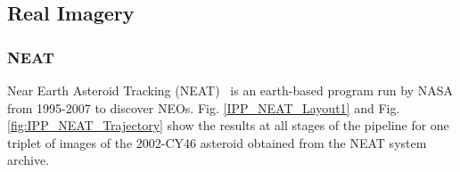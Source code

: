 \subsection{Real Imagery}

\subsubsection{NEAT}
Near Earth Asteroid Tracking (NEAT)~\cite{neat2014} is an earth-based program run by NASA from 1995-2007 to discover NEOs.
Fig. \ref{IPP_NEAT_Layout1} and Fig. \ref{fig:IPP_NEAT_Trajectory} show the results at all stages of the pipeline for one triplet of images of the 2002-CY46 asteroid obtained from the NEAT system archive. 
 


